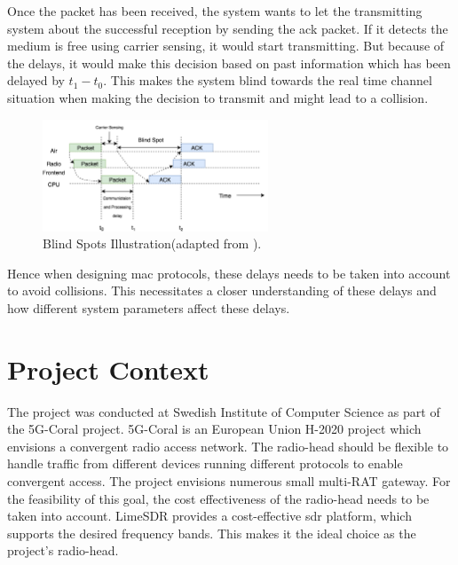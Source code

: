 Once the packet has been received, the system wants to let the transmitting system about the successful reception by sending the \ac{ack} packet. If it detects the medium is free using carrier sensing, it would start transmitting.
But because of the delays, it would make this decision based on past information which has been delayed by $t_1 - t_0$.
This makes the system blind towards the real time channel situation when making the decision to transmit and might lead to a collision. \\ 

\begin{figure}[!h]
\centering
\includegraphics[width=0.6\textwidth]{Figure/BlindSpots.png}
\caption{Blind Spots Illustration(adapted from \cite{schmid_experimental_2007}).}
\label{blind_spots}
\end{figure}

Hence when designing \ac{mac} protocols, these delays needs to be taken into account to avoid collisions.
This necessitates a closer understanding of these delays and how different system parameters affect these delays.



\section{Project Context}

The project was conducted at Swedish Institute of Computer Science as part of the 5G-Coral project.
5G-Coral is an European Union H-2020 project which envisions a convergent radio access network.
The radio-head should be flexible to handle traffic from different devices running different protocols to enable convergent access.
The project envisions numerous small multi-\ac{RAT} gateway.
For the feasibility of this goal, the cost effectiveness of the radio-head needs to be taken into account.
LimeSDR \cite{noauthor_limesdr_nodate} provides a cost-effective \ac{sdr} platform, which supports the desired frequency bands.
This makes it the ideal choice as the project's radio-head.\\

